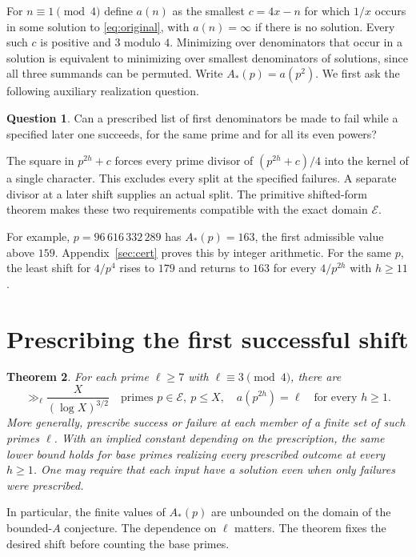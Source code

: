 \documentclass[a4paper,11pt]{article}
\newtheorem{theorem}{Theorem}[section]
\theoremstyle{definition}\newtheorem{question}[theorem]{Question}
\newcommand{\E}{\mathcal E}
\begin{document}
For $n\equiv1\pmod4$ define $a(n)$ as the smallest $c=4x-n$ for which $1/x$ occurs in some solution to \eqref{eq:original}, with $a(n)=\infty$ if there is no solution. Every such $c$ is positive and $3$ modulo $4$. Minimizing over denominators that occur in a solution is equivalent to minimizing over smallest denominators of solutions, since all three summands can be permuted. Write $A_*(p)=a(p^2)$. We first ask the following auxiliary realization question.
\begin{question}
Can a prescribed list of first denominators be made to fail while a specified later one succeeds, for the same prime and for all its even powers?
\end{question}
The square in $p^{2h}+c$ forces every prime divisor of $(p^{2h}+c)/4$ into the kernel of a single character. This excludes every split at the specified failures. A separate divisor at a later shift supplies an actual split. The primitive shifted-form theorem \cite{fhrss} makes these two requirements compatible with the exact domain $\E$.

For example, $p=96\,616\,332\,289$ has $A_*(p)=163$, the first admissible value above $159$. Appendix~\ref{sec:cert} proves this by integer arithmetic. For the same $p$, the least shift for $4/p^4$ rises to $179$ and returns to $163$ for every $4/p^{2h}$ with $h\ge11$.

\clearpage
\section{Prescribing the first successful shift}
\begin{theorem}\label{thm:prime-squares}
For each prime $\ell\ge7$ with $\ell\equiv3\pmod4$, there are
\[
 \gg_{\ell}\frac{X}{(\log X)^{3/2}}
 \quad\text{primes }p\in\E,\ p\le X,\quad
 a(p^{2h})=\ell\quad\text{for every }h\ge1 .
\]
More generally, prescribe success or failure at each member of a finite set of such primes $\ell$. With an implied constant depending on the prescription, the same lower bound holds for base primes realizing every prescribed outcome at every $h\ge1$. One may require that each input have a solution even when only failures were prescribed.
\end{theorem}
In particular, the finite values of $A_*(p)$ are unbounded on the domain of the bounded-$A$ conjecture. The dependence on $\ell$ matters. The theorem fixes the desired shift before counting the base primes.
\end{document}
